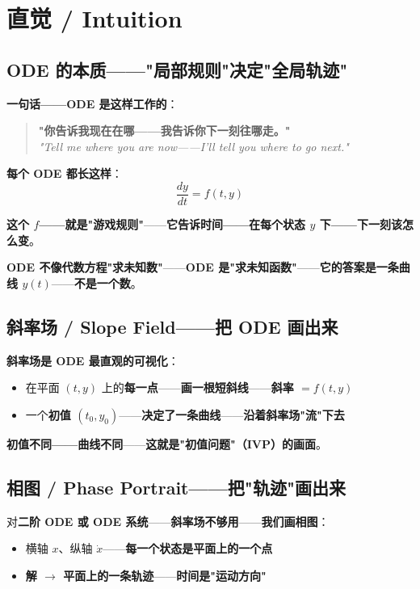 \section{直觉 / Intuition}

\subsection{ODE 的本质——"局部规则"决定"全局轨迹"}

\textbf{一句话——ODE 是这样工作的}：

\begin{quote}
\textbf{"你告诉我现在在哪——我告诉你下一刻往哪走。"}\\[4pt]
\itshape "Tell me where you are now——I'll tell you where to go next."
\end{quote}

\textbf{每个 ODE 都长这样}：
\[
\frac{dy}{dt} = f(t, y)
\]

\textbf{这个 $f$——就是"游戏规则"}——\textbf{它告诉时间——在每个状态 $y$ 下——下一刻该怎么变}。

\textbf{ODE 不像代数方程"求未知数"}——\textbf{ODE 是"求未知函数"}——\textbf{它的答案是\textbf{一条曲线 $y(t)$}}——\textbf{不是\textbf{一个数}}。

\subsection{斜率场 / Slope Field——把 ODE 画出来}

\textbf{斜率场是 ODE 最直观的可视化}：

\begin{itemize}
\item 在平面 $(t, y)$ 上的\textbf{每一点}——\textbf{画一根短斜线}——\textbf{斜率 $= f(t, y)$}
\item 一个\textbf{初值 $(t_0, y_0)$}——\textbf{决定了一条曲线}——\textbf{沿着斜率场"流"下去}
\end{itemize}

\textbf{初值不同——曲线不同}——\textbf{这就是"初值问题"（IVP）的画面}。

\subsection{相图 / Phase Portrait——把"轨迹"画出来}

对\textbf{二阶 ODE 或 ODE 系统}——\textbf{斜率场不够用}——\textbf{我们画相图}：

\begin{itemize}
\item 横轴 $x$、纵轴 $\dot x$——\textbf{每一个状态是平面上的一个点}
\item \textbf{解 $\to$ 平面上的一条轨迹}——\textbf{时间是"运动方向"}
\end{itemize}

